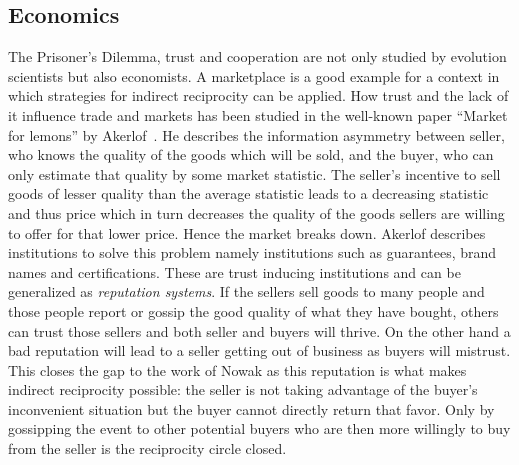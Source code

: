 
\subsection{Economics}
The Prisoner's Dilemma, trust and cooperation are not only studied by evolution scientists but also
economists. A marketplace is a good example for a context in which strategies for indirect reciprocity
can be applied.
How trust and the lack of it influence trade and markets has been studied in the well-known paper ``Market for lemons'' by 
Akerlof~\cite{akerlof1970lemons}. He describes the information asymmetry between seller, who knows
the quality of the goods which will be sold, and the buyer, who can only estimate that quality by 
some market statistic. The seller's incentive to sell goods of lesser quality than the average 
statistic leads to a decreasing statistic and thus price which in turn decreases the quality of the 
goods sellers are willing to offer for that lower price. Hence the market breaks down. Akerlof
describes institutions to solve this problem namely institutions such as guarantees, brand names and
certifications. These are trust inducing institutions and can be generalized as \textit{reputation systems}.
If the sellers sell goods to many people and those people report or gossip the good quality of what
they have bought, others can trust those sellers and both seller and buyers will thrive. On the 
other hand a bad reputation will lead to a seller getting out of business as buyers will mistrust.
This closes the gap to the work of Nowak as this reputation is what makes indirect reciprocity
possible: the seller is not taking advantage of the buyer's inconvenient situation but the buyer
cannot directly return that favor. Only by gossipping the event to other potential buyers who are 
then more willingly to buy from the seller is the reciprocity circle closed.~\cite{nowak2006five}

